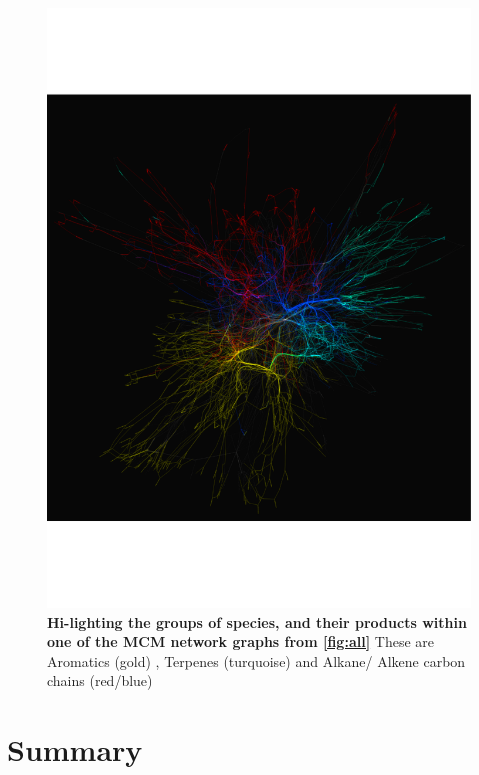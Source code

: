     \begin{figure}[H]
         \centering
    \includegraphics[width=\textwidth,trim={0 4cm 0 4cm},angle=-90]{figures_c1/beijingtest/graphgroups.pdf}
     \caption{\textbf{Hi-lighting the groups of species, and their products within one of the MCM network graphs from \autoref{fig:all}} These are {\color{DarkGoldenrod} Aromatics (gold)} , {\color{DarkTurquoise} Terpenes (turquoise) } and {\color{OrangeRed} Alkane}/{\color{RoyalBlue} Alkene  } carbon chains (red/blue)}
     \label{fig:fncolour}
     \end{figure}





\section{Summary}

